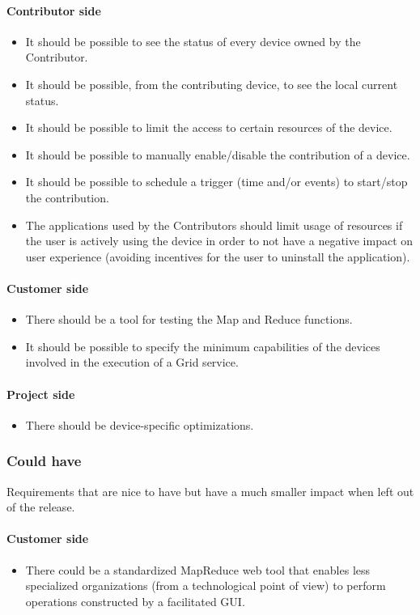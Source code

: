 \paragraph{Contributor side}
\begin{itemize}
    \item It should be possible to see the status of every device owned by the Contributor.
    \item It should be possible, from the contributing device, to see the local current status.
    \item It should be possible to limit the access to certain resources of the device.
    \item It should be possible to manually enable/disable the contribution of a device.
    \item It should be possible to schedule a trigger (time and/or events) to start/stop the contribution.
    \item The applications used by the Contributors should limit usage of resources if the user is actively using the device in order to not have a negative impact on user experience (avoiding incentives for the user to uninstall the application).
\end{itemize}
\paragraph{Customer side}
\begin{itemize}
    \item There should be a tool for testing the Map and Reduce functions.
    \item It should be possible to specify the minimum capabilities of the devices involved in the execution of a Grid service.
\end{itemize}
\paragraph{Project side}
\begin{itemize}
    \item There should be device-specific optimizations.
\end{itemize}

\subsubsection{Could have}
Requirements that are nice to have but have a much smaller impact when left out of the release.
\paragraph{Customer side}
\begin{itemize}
    \item There could be a standardized MapReduce web tool that enables less specialized organizations (from a technological point of view) to perform operations constructed by a facilitated GUI.
\end{itemize}

